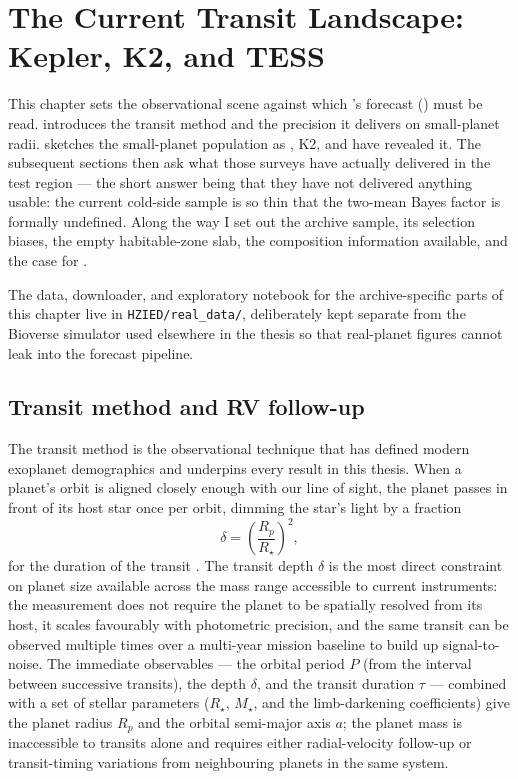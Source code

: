\chapter{The Current Transit Landscape: Kepler, K2, and TESS}
\label{chap:kepler_tess}

This chapter sets the observational scene against which \PLATO's
forecast () must be read.
 introduces the transit method and the
precision it delivers on small-planet radii.
 sketches the small-planet
population as \Kepler{}, K2, and \TESS{} have revealed it.  The
subsequent sections then ask what those surveys have actually
delivered in the \HZIED test region --- the short answer being that
they have not delivered anything usable: the current cold-side sample
is so thin that the two-mean Bayes factor is formally undefined.
Along the way I set out the archive sample, its selection biases,
the empty habitable-zone slab, the composition information available,
and the case for \PLATO.

The data, downloader, and exploratory notebook for the
archive-specific parts of this chapter live in
\texttt{HZIED/real\_data/}, deliberately kept separate from the
Bioverse simulator used elsewhere in the thesis so that real-planet
figures cannot leak into the forecast pipeline.


\section{Transit method and RV follow-up}
\label{sec:transit_method}

The transit method is the observational technique that has defined
modern exoplanet demographics and underpins every result in this
thesis.  When a planet's orbit is aligned closely enough with our line
of sight, the planet passes in front of its host star once per orbit,
dimming the star's light by a fraction
%
\begin{equation}
    \delta = \left(\frac{R_p}{R_\star}\right)^{\!2},
    \label{eq:transit_depth}
\end{equation}
%
for the duration of the transit
\parencite{Seager2003,Winn2010}.  The transit depth $\delta$ is the
most direct constraint on planet size available across the mass range
accessible to current instruments: the measurement does not require
the planet to be spatially resolved from its host, it scales
favourably with photometric precision, and the same transit can be
observed multiple times over a multi-year mission baseline to build
up signal-to-noise.  The immediate observables --- the orbital period
$P$ (from the interval between successive transits), the depth
$\delta$, and the transit duration $\tau$ --- combined with a set of
stellar parameters ($R_\star$, $M_\star$, and the limb-darkening
coefficients) give the planet radius $R_p$ and the orbital semi-major
axis $a$; the planet mass is inaccessible to transits alone and
requires either radial-velocity follow-up or transit-timing variations
from neighbouring planets in the same system.

